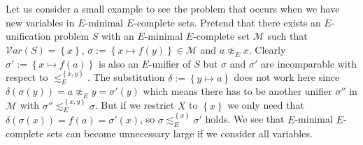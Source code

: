 Let us consider a small example to see the problem that occurs when we have new variables in $E$-minimal $E$-complete sets. Pretend that there exists an $E$-unification problem $S$ with an $E$-minimal $E$-complete set $\mathcal{M}$ such that $\mathcal{V}ar(S)=\left\lbrace x\right\rbrace$, $\sigma:=\left\lbrace x\mapsto f(y)\right\rbrace\in\mathcal{M}$ and $ a\not\approx_E x$. 
Clearly $\sigma':=\left\lbrace x\mapsto f(a)\right\rbrace$ is also an $E$-unifier of $S$ but $\sigma$ and $\sigma'$ are incomparable with respect to $\lesssim^{\left\lbrace x,y\right\rbrace }_E$. The substitution $\delta:=\left\lbrace y\mapsto a\right\rbrace $ does not work here since $\delta(\sigma(y))=a \not\approx_E y=\sigma'(y)$ which means there has to be another unifier $\sigma''$ in $\mathcal{M}$ with $\sigma''\lesssim^{\left\lbrace x,y\right\rbrace }_E\sigma$. But if we restrict $X$ to $\left\lbrace x\right\rbrace $ we only need that $\delta(\sigma(x))=f(a)=\sigma'(x)$, so $\sigma\lesssim^{\left\lbrace x\right\rbrace }_E\sigma'$ holds. We see that $E$-minimal $E$-complete sets can become unnecessary large if we consider all variables.

